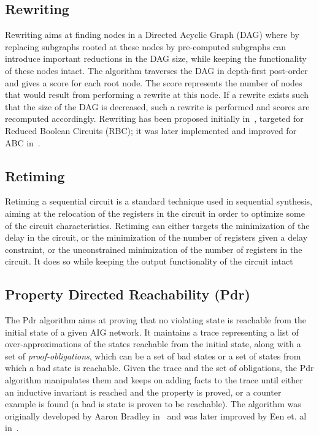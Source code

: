 \subsection{Rewriting}
Rewriting aims at finding nodes in a Directed Acyclic Graph (DAG) where by replacing subgraphs rooted 
at these nodes by pre-computed subgraphs can introduce important reductions in the DAG size, while 
keeping the functionality of these nodes intact. The algorithm traverses the DAG in depth-first post-order
and gives a score for each root node. The score represents the number of nodes that would result
from performing a rewrite at this node. If a rewrite exists such that the size of the DAG is decreased, such 
a rewrite is performed and scores are recomputed accordingly.  
Rewriting has been proposed initially in~\cite{bjesse2004dag}, targeted for Reduced Boolean Circuits (RBC); 
it was later implemented and improved for ABC in~\cite{mishchenko2006dag}. 

\subsection{Retiming}
Retiming a sequential circuit is a standard technique used in sequential synthesis, 
aiming at the relocation of the registers in the circuit in order to optimize 
some of the circuit characteristics. Retiming can either targets the minimization of the delay 
in the circuit, or the minimization of the number of registers given a delay constraint, 
or the unconstrained minimization of the number of registers in the circuit. It 
does so while keeping the output functionality of the circuit intact~\cite{hurst2007fast}

\subsection{Property Directed Reachability (Pdr)}
The Pdr algorithm aims at proving that no 
violating state is reachable from the initial state of a given AIG network. 
It maintains a trace representing a list of over-approximations of the states
reachable from the initial state, along with a set of {\em proof-obligations}, 
which can be a set of bad states or a set of states from which a bad state is
reachable. Given the trace and the set of obligations, the Pdr algorithm manipulates 
them and keeps on adding facts to the trace until either an inductive invariant 
is reached and the property is proved, or a counter example is found (a bad is state
is proven to be reachable). The algorithm was originally developed by Aaron Bradley 
in~\cite{bradley2011sat, bradley2007checking} and was later improved by Een et. al in~\cite{een2011efficient}.


